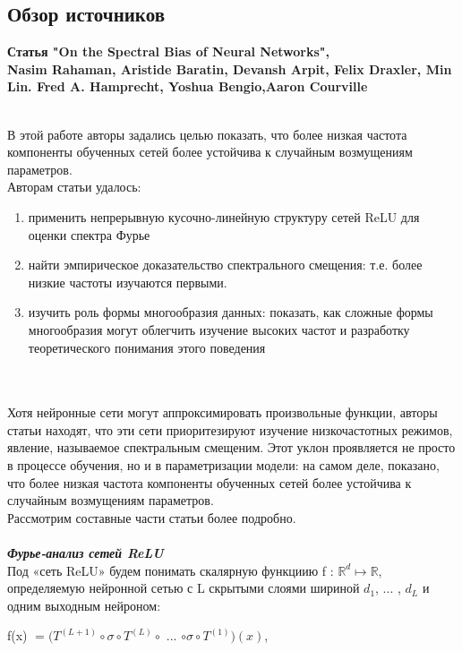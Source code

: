 \documentclass{article}
\begin{document}
    \newpage
    \begin{center} 
    \section{Обзор источников}
    \large \textbf {Статья "On the Spectral Bias of Neural Networks", \\ Nasim Rahaman, Aristide Baratin, Devansh Arpit, Felix Draxler, Min Lin. Fred A. Hamprecht, Yoshua Bengio,Aaron Courville}    
    \end{center}
    \\
    \large 
    В этой работе авторы задались целью показать, что более низкая частота компоненты обученных сетей более устойчива к случайным возмущениям параметров. 
    \\
    Авторам статьи удалось:
    \begin{enumerate}
    \item применить непрерывную кусочно-линейную структуру сетей ReLU для оценки спектра Фурье
    \item найти эмпирическое доказательство спектрального смещения: т.е. более низкие частоты изучаются первыми. 
    \item изучить роль формы многообразия данных: показать, как сложные формы многообразия могут облегчить изучение высоких частот и разработку теоретического понимания этого поведения
    \end{enumerate}
    \\ \\
    Хотя нейронные сети могут аппроксимировать произвольные функции, авторы статьи находят, что эти сети приоритезируют изучение низкочастотных режимов, явление, называемое спектральным смещеним. Этот уклон проявляется не просто в процессе обучения, но и в параметризации модели: на самом деле, показано, что более низкая частота компоненты обученных сетей более устойчива к случайным возмущениям параметров.
    \\
    Рассмотрим составные части статьи более подробно.
    \\ \\
    \textbf {\textit{Фурье-анализ сетей ReLU}}
    \\
    Под «сеть ReLU» будем понимать скалярную функциию f : ${\mathbb{R}}^{d} \mapsto {\mathbb{R}}$, определяемую нейронной сетью с L скрытыми слоями шириной $d_1$, ... , $d_L$ и одним выходным нейроном:
    \\
    \begin{center} 
    f(x) $= (T^{(L+1)} \circ \sigma \circ T^{(L)} \circ $ ... $ \circ \sigma \circ T^{(1)})(x)$,
    \end{center}
\end{document}
